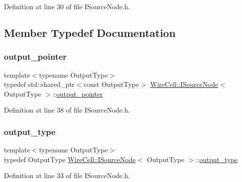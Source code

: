 Definition at line 30 of file I\+Source\+Node.\+h.



\subsection{Member Typedef Documentation}
\mbox{\label{class_wire_cell_1_1_i_source_node_ae2743237513016d7f69d68aac1104951}} 
\subsubsection{\texorpdfstring{output\+\_\+pointer}{output\_pointer}}
{\footnotesize\ttfamily template$<$typename Output\+Type$>$ \\
typedef std\+::shared\+\_\+ptr$<$const Output\+Type$>$ \hyperlink{class_wire_cell_1_1_i_source_node}{Wire\+Cell\+::\+I\+Source\+Node}$<$ Output\+Type $>$\+::\hyperlink{class_wire_cell_1_1_i_source_node_ae2743237513016d7f69d68aac1104951}{output\+\_\+pointer}}



Definition at line 38 of file I\+Source\+Node.\+h.

\mbox{\label{class_wire_cell_1_1_i_source_node_a8db14c0eec2d0faac21bb1801d71600a}} 
\subsubsection{\texorpdfstring{output\+\_\+type}{output\_type}}
{\footnotesize\ttfamily template$<$typename Output\+Type$>$ \\
typedef Output\+Type \hyperlink{class_wire_cell_1_1_i_source_node}{Wire\+Cell\+::\+I\+Source\+Node}$<$ Output\+Type $>$\+::\hyperlink{class_wire_cell_1_1_i_source_node_a8db14c0eec2d0faac21bb1801d71600a}{output\+\_\+type}}



Definition at line 33 of file I\+Source\+Node.\+h.

